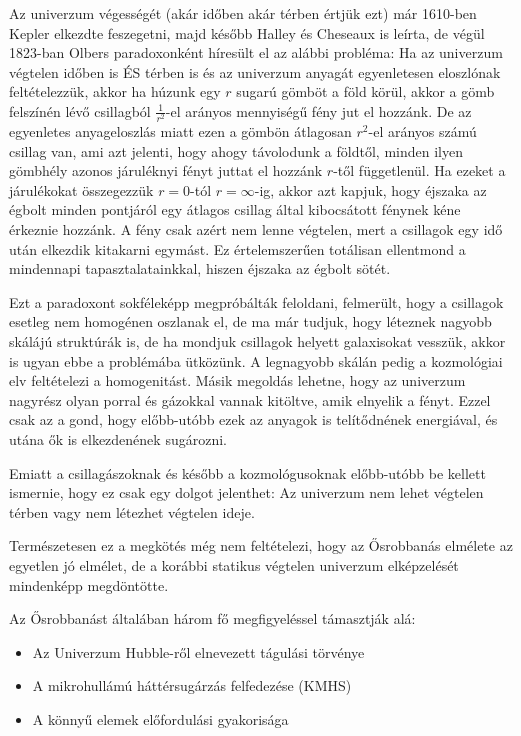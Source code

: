 \documentclass[../main.tex]{subfiles}
\begin{document}
Az univerzum végességét (akár időben akár térben értjük ezt) már 1610-ben Kepler elkezdte feszegetni, majd később Halley és Cheseaux is leírta, de végül 1823-ban Olbers paradoxonként híresült el az alábbi probléma:
Ha az univerzum végtelen időben is ÉS térben is és az univerzum anyagát egyenletesen eloszlónak feltételezzük, akkor ha húzunk egy $r$ sugarú gömböt a föld körül, akkor a gömb felszínén lévő csillagból $\frac{1}{r^2}$-el arányos mennyiségű fény jut el hozzánk.
De az egyenletes anyageloszlás miatt ezen a gömbön átlagosan $r^2$-el arányos számú csillag van, ami azt jelenti, hogy ahogy távolodunk a földtől, minden ilyen gömbhély azonos járuléknyi fényt juttat el hozzánk $r$-től függetlenül.
Ha ezeket a járulékokat összegezzük $r = 0$-tól $r = \infty$-ig, akkor azt kapjuk, hogy éjszaka az égbolt minden pontjáról egy átlagos csillag által kibocsátott fénynek kéne érkeznie hozzánk. A fény csak azért nem lenne végtelen,
mert a csillagok egy idő után elkezdik kitakarni egymást. Ez értelemszerűen totálisan ellentmond a mindennapi tapasztalatainkkal, hiszen éjszaka az égbolt sötét.

Ezt a paradoxont sokféleképp megpróbálták feloldani, felmerült, hogy a csillagok esetleg nem homogénen oszlanak el, de ma már tudjuk, hogy léteznek nagyobb skálájú struktúrák is, de ha mondjuk csillagok helyett galaxisokat vesszük,
akkor is ugyan ebbe a problémába ütközünk. A legnagyobb skálán pedig a kozmológiai elv feltételezi a homogenitást. Másik megoldás lehetne, hogy az univerzum nagyrész olyan porral és gázokkal vannak kitöltve, amik elnyelik a fényt.
Ezzel csak az a gond, hogy előbb-utóbb ezek az anyagok is telítődnének energiával, és utána ők is elkezdenének sugározni. 

Emiatt a csillagászoknak és később a kozmológusoknak előbb-utóbb be kellett ismernie, hogy ez csak egy dolgot jelenthet: Az univerzum nem lehet végtelen térben vagy nem létezhet végtelen ideje.

Természetesen ez a megkötés még nem feltételezi, hogy az Ősrobbanás elmélete az egyetlen jó elmélet, de a korábbi statikus végtelen univerzum elképzelését mindenképp megdöntötte.

Az Ősrobbanást általában három fő megfigyeléssel támasztják alá:
\begin{itemize}
    \item Az Univerzum Hubble-ről elnevezett tágulási törvénye
    \item A mikrohullámú háttérsugárzás felfedezése (KMHS)
    \item A könnyű elemek előfordulási gyakorisága
\end{itemize}
\end{document}
